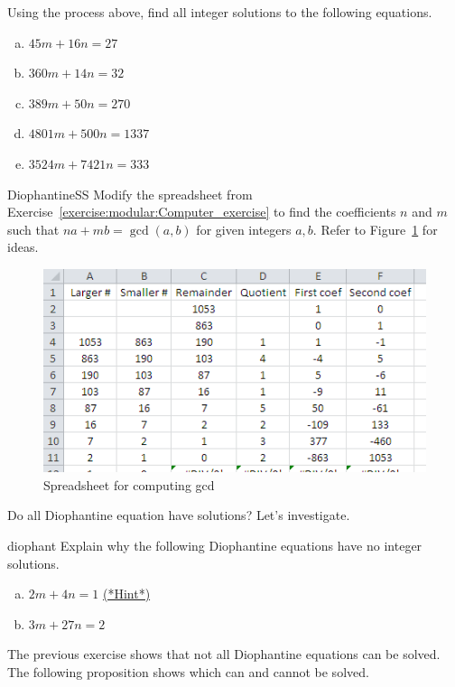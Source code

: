 \begin {exercise}{}
Using the process above, find all integer solutions to the following equations.
\begin {enumerate} [(a)]
\item
$45m + 16n = 27$
\item
$360m + 14n = 32$
\item
$389m + 50n = 270$
\item
$4801m + 500n = 1337$
\item
$ 3524m + 7421n = 333$
\end {enumerate}
\end {exercise}

\begin{exercise}{DiophantineSS}
Modify the spreadsheet from Exercise~\ref{exercise:modular:Computer_exercise} to find the coefficients $n$ and $m$ such that $na + mb = \gcd(a,b)$ for given integers $a,b$.  Refer to Figure~\ref{fig:gcd_spreadsheet_with_coefs} for ideas.
\end{exercise}

\begin{figure}[h]
\begin{center}
\includegraphics[width=4.5in]{images/gcd_spreadsheet_with_coefs.png}
\end{center}
\caption{Spreadsheet for computing gcd}\label{fig:gcd_spreadsheet_with_coefs}
\end{figure}


Do all  Diophantine equation have solutions? Let's investigate.

\begin {exercise}{diophant}
Explain why the following Diophantine equations have no integer solutions.
\begin {enumerate} [(a)]
\item
$2m + 4n = 1$
\hyperref[sec:modular_arithmetic:hints]{(*Hint*)}
\item
$3m + 27n = 2$
\end {enumerate}
\end {exercise}
The previous exercise shows that not all Diophantine equations can be solved.  The following proposition shows which can and cannot be solved.

